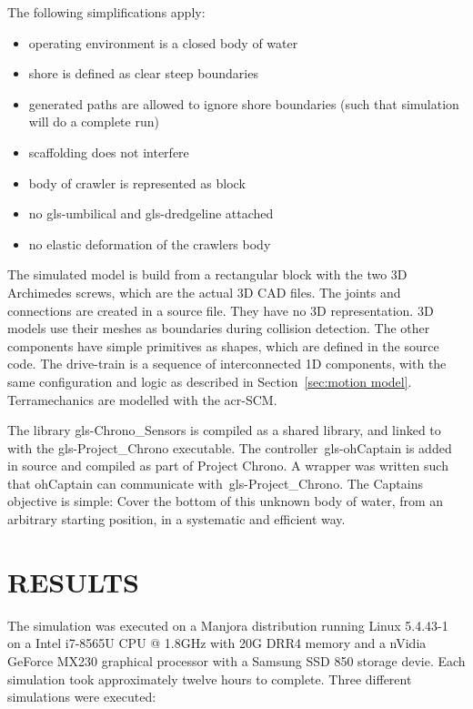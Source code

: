 \noindent The following simplifications apply:

\begin{itemize}
    \setlength\itemsep{0mm}
    \item operating environment is a closed body of water
    \item shore is defined as clear steep boundaries
    \item generated paths are allowed to ignore shore boundaries (such that simulation will do a complete run)
    \item scaffolding does not interfere
    \item body of crawler is represented as block
    \item no \gls{gls-umbilical} and \gls{gls-dredgeline} attached
    \item no elastic deformation of the crawlers body
\end{itemize}

The simulated model is build from a rectangular block with the two 3D Archimedes screws, which are the actual 3D CAD
files. The joints and connections are created in a source file. They have no 3D representation. 3D models use their
meshes as boundaries during collision detection. The other components have simple primitives as shapes, which are
defined in the source code. The drive-train is a sequence of interconnected 1D components, with the same configuration
and logic as described in Section~\ref{sec:motion model}. Terramechanics are modelled with the \gls{acr-SCM}.

The library \gls{gls-Chrono_Sensors} is compiled as a shared library, and linked to with the \gls{gls-Project_Chrono}
executable. The controller~\gls{gls-ohCaptain} is added in source and compiled as part of Project Chrono. A wrapper
was written such that ohCaptain can communicate with~\gls{gls-Project_Chrono}. The Captains objective is simple: Cover
the bottom of this unknown body of water, from an arbitrary starting position, in a systematic and efficient way.


\section{RESULTS}\label{sec:results}

The simulation was executed on a Manjora distribution running Linux 5.4.43-1 on a Intel i7-8565U CPU @ 1.8GHz with 20G
DRR4 memory and a nVidia GeForce MX230 graphical processor with a Samsung SSD 850 storage devie. Each simulation took
approximately twelve hours to complete. Three different simulations were executed:


